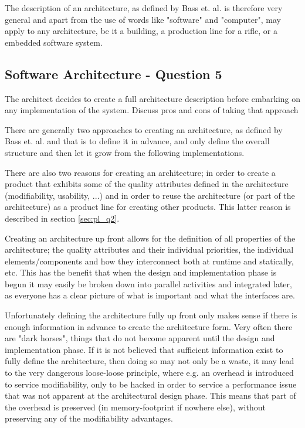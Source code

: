 The description of an architecture, as defined by Bass et. al. is therefore very general and apart from the use of words like "software" and "computer", may apply to any architecture, be it a building, a production line for a rifle, or a embedded software system.

\subsection{Software Architecture - Question 5}

\begin{question}
The architect decides to create a full architecture
description before embarking on any implementation of the
system. Discuss pros and cons of taking that approach
\end{question}

There are generally two approaches to creating an architecture, as defined by Bass et. al. and that is to define it in advance, and only define the overall structure and then let it grow from the following implementations. 

There are also two reasons for creating an architecture; in order to create a product that exhibits some of the quality attributes defined in the architecture (modifiability, usability, ...) and in order to reuse the architecture (or part of the architecture) as a product line for creating other products. This latter reason is described in section \ref{sec:pl_q2}.

Creating an architecture up front allows for the definition of all properties of the architecture; the quality attributes and their individual priorities, the individual elements/components and how they interconnect both at runtime and statically, etc. This has the benefit that when the design and implementation phase is begun it may easily be broken down into parallel activities and integrated later, as everyone has a clear picture of what is important and what the interfaces are.

Unfortunately defining the architecture fully up front only makes sense if there is enough information in advance to create the architecture form. Very often there are "dark horses", things that do not become apparent until the design and implementation phase. If it is not believed that sufficient information exist to fully define the architecture, then doing so may not only be a waste, it may lead to the very dangerous loose-loose principle, where e.g. an overhead is introduced to service modifiability, only to be hacked in order to service a performance issue that was not apparent at the architectural design phase. This means that part of the overhead is preserved (in memory-footprint if nowhere else), without preserving any of the modifiability advantages.

